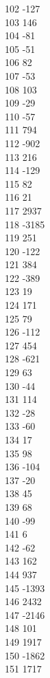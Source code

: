{ 102	-127 \\
 103	146 \\
 104	-81 \\
 105	-51 \\
 106	82 \\
 107	-53 \\
 108	103 \\
 109	-29 \\
 110	-57 \\
 111	794 \\
 112	-902 \\
 113	216 \\
 114	-129 \\
 115	82 \\
 116	21 \\
 117	2937 \\
 118	-3185 \\
 119	251 \\
 120	-122 \\
 121	384 \\
 122	-389 \\
 123	19 \\
 124	171 \\
 125	79 \\
 126	-112 \\
 127	454 \\
 128	-621 \\
 129	63 \\
 130	-44 \\
 131	114 \\
 132	-28 \\
 133	-60 \\
 134	17 \\
 135	98 \\
 136	-104 \\
 137	-20 \\
 138	45 \\
 139	68 \\
 140	-99 \\
 141	6 \\
 142	-62 \\
 143	162 \\
 144	937 \\
 145	-1393 \\
 146	2432 \\
 147	-2146 \\
 148	101 \\
 149	1917 \\
 150	-1862 \\
 151	1717 \\
}
